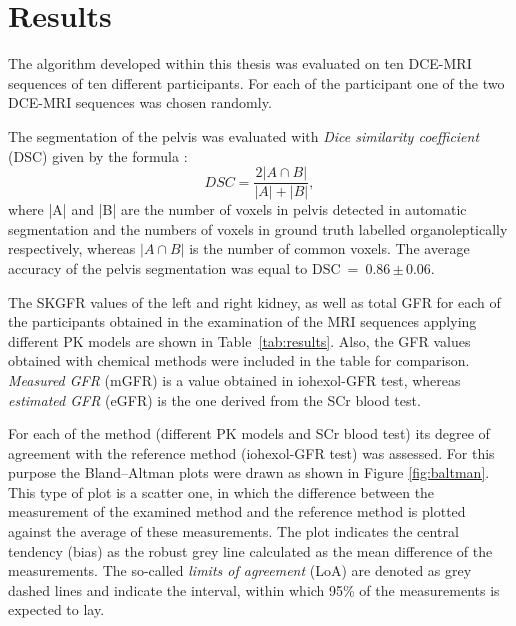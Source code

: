 \chapter{Results}
The algorithm developed within this thesis was evaluated on ten DCE-MRI sequences of ten different participants. For each of the participant one of the two  DCE-MRI sequences was chosen randomly.

The segmentation of the pelvis was evaluated with \textit{Dice similarity coefficient} (DSC) given by the formula \cite{dice1945measures}:
\begin{equation}
	\label{eq:dice}
	DSC = \dfrac{2|A\cap{}B|}{|A|+|B|},
\end{equation}
where |A| and |B| are the number of voxels in pelvis detected  in automatic segmentation and the numbers of voxels in ground truth labelled organoleptically respectively, whereas $|A\cap{}B|$ is the number of common voxels.
The average accuracy of the pelvis segmentation was equal to DSC~=~0.86\,$\pm$\,0.06.

The SKGFR values of the left and right kidney, as well as total GFR for each of the participants obtained in the examination of the MRI sequences applying different PK models are shown in Table~\ref{tab:results}. Also, the GFR values obtained with chemical methods were included in the table for comparison. \textit{Measured GFR} (mGFR) is a value obtained in iohexol-GFR test, whereas \textit{estimated GFR} (eGFR) is the one derived from the SCr blood test.

For each of the method (different PK models and SCr blood test) its degree of agreement with the reference method  (iohexol-GFR test) was assessed. For this purpose the Bland–Altman plots \cite{bland1986statistical} were drawn as shown in Figure \ref{fig:baltman}. 
This type of plot is a scatter one, in which the difference between the measurement of the examined method and the reference method is plotted against the average of these measurements.
The plot indicates the central tendency (bias) as the robust grey line calculated as the mean difference of the measurements. The so-called \textit{limits of agreement} (LoA) are denoted as grey dashed lines and indicate the interval, within which 95\% of the measurements is expected to lay.

